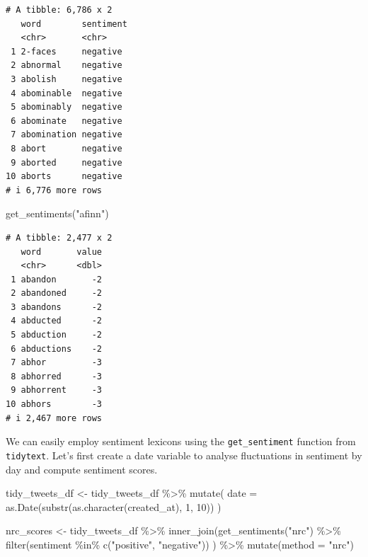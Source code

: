 \documentclass[
  letterpaper,
  DIV=11,
  numbers=noendperiod]{scrreprt}
\newenvironment{Shaded}{\begin{snugshade}}{\end{snugshade}}
\newcommand{\AttributeTok}[1]{\textcolor[rgb]{0.40,0.45,0.13}{#1}}
\newcommand{\DecValTok}[1]{\textcolor[rgb]{0.68,0.00,0.00}{#1}}
\newcommand{\FunctionTok}[1]{\textcolor[rgb]{0.28,0.35,0.67}{#1}}
\newcommand{\NormalTok}[1]{\textcolor[rgb]{0.00,0.23,0.31}{#1}}
\newcommand{\OtherTok}[1]{\textcolor[rgb]{0.00,0.23,0.31}{#1}}
\newcommand{\SpecialCharTok}[1]{\textcolor[rgb]{0.37,0.37,0.37}{#1}}
\newcommand{\StringTok}[1]{\textcolor[rgb]{0.13,0.47,0.30}{#1}}
\begin{document}
\begin{verbatim}
# A tibble: 6,786 x 2
   word        sentiment
   <chr>       <chr>    
 1 2-faces     negative 
 2 abnormal    negative 
 3 abolish     negative 
 4 abominable  negative 
 5 abominably  negative 
 6 abominate   negative 
 7 abomination negative 
 8 abort       negative 
 9 aborted     negative 
10 aborts      negative 
# i 6,776 more rows
\end{verbatim}

\begin{Shaded}
\begin{Highlighting}[]
\FunctionTok{get\_sentiments}\NormalTok{(}\StringTok{"afinn"}\NormalTok{) }
\end{Highlighting}
\end{Shaded}

\begin{verbatim}
# A tibble: 2,477 x 2
   word       value
   <chr>      <dbl>
 1 abandon       -2
 2 abandoned     -2
 3 abandons      -2
 4 abducted      -2
 5 abduction     -2
 6 abductions    -2
 7 abhor         -3
 8 abhorred      -3
 9 abhorrent     -3
10 abhors        -3
# i 2,467 more rows
\end{verbatim}

We can easily employ sentiment lexicons using the
\texttt{get\_sentiment} function from \texttt{tidytext}. Let's first
create a date variable to analyse fluctuations in sentiment by day and
compute sentiment scores.

\begin{Shaded}
\begin{Highlighting}[]
\NormalTok{tidy\_tweets\_df }\OtherTok{\textless{}{-}}\NormalTok{ tidy\_tweets\_df }\SpecialCharTok{\%\textgreater{}\%}
  \FunctionTok{mutate}\NormalTok{(}
    \AttributeTok{date =} \FunctionTok{as.Date}\NormalTok{(}\FunctionTok{substr}\NormalTok{(}\FunctionTok{as.character}\NormalTok{(created\_at),}
                          \DecValTok{1}\NormalTok{,}
                          \DecValTok{10}\NormalTok{))}
\NormalTok{  )}
\end{Highlighting}
\end{Shaded}

\begin{Shaded}
\begin{Highlighting}[]
\NormalTok{nrc\_scores }\OtherTok{\textless{}{-}}\NormalTok{ tidy\_tweets\_df }\SpecialCharTok{\%\textgreater{}\%}
  \FunctionTok{inner\_join}\NormalTok{(}\FunctionTok{get\_sentiments}\NormalTok{(}\StringTok{"nrc"}\NormalTok{) }\SpecialCharTok{\%\textgreater{}\%} 
                 \FunctionTok{filter}\NormalTok{(sentiment }\SpecialCharTok{\%in\%} \FunctionTok{c}\NormalTok{(}\StringTok{"positive"}\NormalTok{, }
                                         \StringTok{"negative"}\NormalTok{))}
\NormalTok{             ) }\SpecialCharTok{\%\textgreater{}\%}
  \FunctionTok{mutate}\NormalTok{(}\AttributeTok{method =} \StringTok{"nrc"}\NormalTok{)}
\end{Highlighting}
\end{Shaded}
\end{document}
